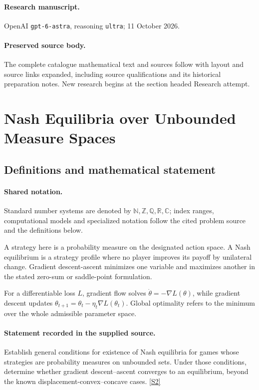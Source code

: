 \documentclass[11pt]{article}
\begin{document}
\paragraph{Research manuscript.} OpenAI \texttt{gpt-6-astra}, reasoning \texttt{ultra}; 11 October 2026.
\paragraph{Preserved source body.} The complete catalogue mathematical text and sources follow with layout and source links expanded, including source qualifications and its historical preparation notes. New research begins at the section headed Research attempt.

\section{Nash Equilibria over Unbounded Measure Spaces}\label{statement}

\subsection{Definitions and mathematical statement}

\paragraph{Shared notation.}Standard number systems are denoted by $\mathbb N,\mathbb Z,\mathbb Q,\mathbb R,\mathbb C$; index ranges, computational models and specialized notation follow the cited problem source and the definitions below.


A strategy here is a probability measure on the designated action space. A Nash equilibrium is a strategy profile where no player improves its payoff by unilateral change. Gradient descent-ascent minimizes one variable and maximizes another in the stated zero-sum or saddle-point formulation.

For a differentiable loss $L$, gradient flow solves $\dot\theta=-\nabla L(\theta)$, while gradient descent updates $\theta_{t+1}=\theta_t-\eta_t\nabla L(\theta_t)$. Global optimality refers to the minimum over the whole admissible parameter space.
\paragraph{Statement recorded in the supplied source.}
Establish general conditions for existence of Nash equilibria for games whose strategies are probability measures on unbounded sets. Under those conditions, determine whether gradient descent–ascent converges to an equilibrium, beyond the known displacement-convex–concave cases. \href{https://doi.org/10.4171/owr/2024/56}{[S2]}
\end{document}
